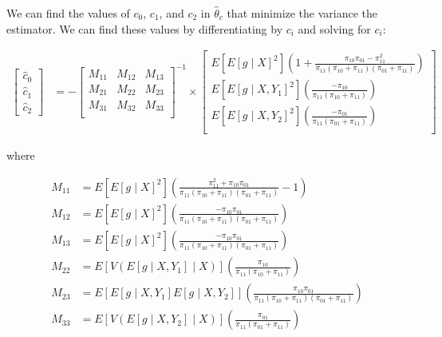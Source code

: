 \documentclass[12pt]{article}
\begin{document}
We can find the values of 
$c_0$, $c_1$, and $c_2$ in $\hat \theta_c$ that minimize the variance the 
estimator. We can find these values by differentiating by $c_i$ and solving 
for $c_i$:

\begin{align*}
  \begin{bmatrix} \hat c_0 \\ \hat c_1 \\ \hat c_2 \end{bmatrix} 
  &= -
  \begin{bmatrix} 
    M_{11} & M_{12} & M_{13} \\
    M_{21} & M_{22} & M_{23} \\
    M_{31} & M_{32} & M_{33} \\
  \end{bmatrix}^{-1}
  \times 
  \begin{bmatrix}
    E[E[g \mid X]^2] \left(1 + \frac{\pi_{10}\pi_{01} - \pi_{11}^2}{\pi_{11}(\pi_{10} + \pi_{11})(\pi_{01} + \pi_{11})}\right) \\
    E[E[g \mid X, Y_1]^2] \left(\frac{-\pi_{10}}{\pi_{11}(\pi_{10} + \pi_{11})}\right) \\
    E[E[g \mid X, Y_2]^2] \left(\frac{-\pi_{01}}{\pi_{11}(\pi_{01} + \pi_{11})}\right) \\
  \end{bmatrix}
\end{align*}

where 

\begin{align*}
  M_{11} &= E[E[g \mid X]^2] \left(\frac{\pi_{11}^2 + \pi_{10}\pi_{01}}{\pi_{11}(\pi_{10} + \pi_{11})(\pi_{01} + \pi_{11})} - 1\right) \\
  M_{12} &= E[E[g \mid X]^2] \left(\frac{-\pi_{10}\pi_{01}}{\pi_{11}(\pi_{10} + \pi_{11})(\pi_{01} + \pi_{11})}\right) \\
  M_{13} &= E[E[g \mid X]^2] \left(\frac{-\pi_{10}\pi_{01}}{\pi_{11}(\pi_{10} + \pi_{11})(\pi_{01} + \pi_{11})}\right) \\
  M_{22} &= E[V(E[g \mid X, Y_1] \mid X)] \left(\frac{\pi_{10}}{\pi_{11}(\pi_{10} + \pi_{11})}\right) \\
  M_{23} &= E[E[g \mid X, Y_1]E[g \mid X, Y_2]] \left(\frac{\pi_{10}\pi_{01}}{\pi_{11}(\pi_{10} + \pi_{11})(\pi_{01} + \pi_{11})}\right) \\
  M_{33} &= E[V(E[g \mid X, Y_2] \mid X)] \left(\frac{\pi_{01}}{\pi_{11}(\pi_{01} + \pi_{11})}\right)
\end{align*}
\end{document}
